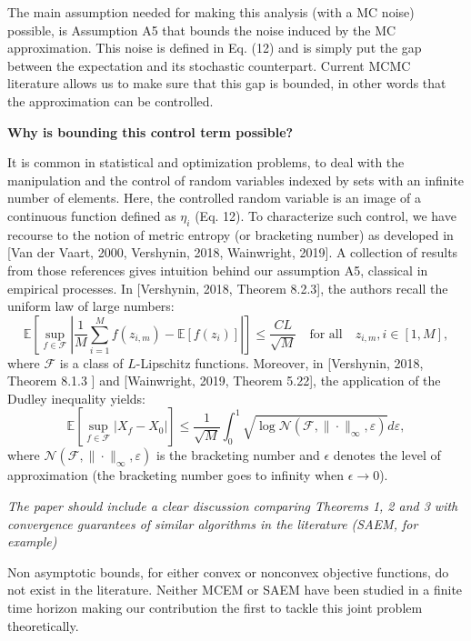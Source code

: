 \documentclass[anon,12pt]{alt2021} %
\begin{document}
The main assumption needed for making this analysis (with a MC noise) possible, is Assumption A5 that bounds the noise induced by the MC approximation. This noise is defined in Eq. (12) and is simply put the gap between the expectation and its stochastic counterpart.
Current MCMC literature allows us to make sure that this gap is bounded, in other words that the approximation can be controlled.

\textbf{Why is bounding this control term possible?} 

It is  common in statistical and optimization problems, to deal with the manipulation and the control of random variables indexed by sets with an infinite number of elements. 
Here, the controlled random variable is an image of a continuous function defined as $\eta_i$ (Eq. 12).
To characterize such control, we have recourse to the notion of metric entropy (or bracketing number) as developed in [Van der Vaart, 2000, Vershynin, 2018, Wainwright, 2019].
A collection of results from those references gives intuition behind our assumption A5, classical in empirical processes.
In [Vershynin, 2018, Theorem 8.2.3], the authors recall the uniform law of large numbers:
$$\mathbb{E} \left[\underset{f \in \mathcal{F}}{ \sup } \left|\frac{1}{M} \sum_{i=1}^{M} f\left(z_{i,m}\right)-\mathbb{E}[f(z_i)]\right| \right] \leq \frac{C L}{\sqrt{M}} \quad \textrm{for all} \quad z_{i,m}, i \in [1, M] ,$$
where $\mathcal{F}$ is a class of $L$-Lipschitz functions.
Moreover, in [Vershynin, 2018, Theorem 8.1.3 ] and [Wainwright, 2019, Theorem 5.22], the application of the Dudley inequality yields:
$$
\mathbb{E} [ \underset{f \in \mathcal{F}}{\sup} |X_{f}-X_{0} | ] \leq \frac{1}{\sqrt{M}} \int_{0}^{1} \sqrt{\log \mathcal{N}\left(\mathcal{F},\|\cdot\|_{\infty}, \varepsilon\right)} d \varepsilon ,
$$
where $\mathcal{N}\left(\mathcal{F},\|\cdot\|_{\infty}, \varepsilon\right)$ is the bracketing number and $\epsilon$ denotes the level of approximation (the bracketing number goes to infinity when $\epsilon  \to 0$). 




\vspace{0.05in}
\textit{The paper should include a clear discussion comparing Theorems 1, 2 and 3 with convergence guarantees of similar algorithms
in the literature (SAEM, for example)}
\vspace{0.05in}

Non asymptotic bounds, for either convex or nonconvex objective functions, do not exist in the literature. 
Neither MCEM or SAEM have been studied in a finite time horizon making our contribution the first to tackle this joint problem theoretically.
\end{document}
